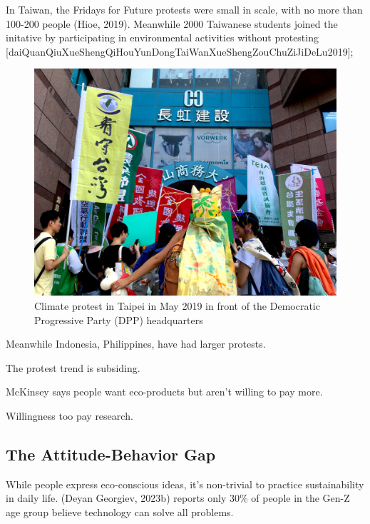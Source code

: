 \documentclass[
  letterpaper,
  DIV=11,
  numbers=noendperiod]{scrartcl}
\begin{document}
In Taiwan, the Fridays for Future protests were small in scale, with no
more than 100-200 people (Hioe, 2019). Meanwhile 2000 Taiwanese students
joined the initative by participating in environmental activities
without protesting
{[}daiQuanQiuXueShengQiHouYunDongTaiWanXueShengZouChuZiJiDeLu2019{]};

\begin{figure}[H]

{\centering \includegraphics[width=1\linewidth,height=\textheight,keepaspectratio]{./images/college/taipei.jpg}

}

\caption{Climate protest in Taipei in May 2019 in front of the
Democratic Progressive Party (DPP) headquarters}

\end{figure}%

Meanwhile Indonesia, Philippines, have had larger protests.

The protest trend is subsiding.

McKinsey says people want eco-products but aren't willing to pay more.

Willingness too pay research.

\subsection{The Attitude-Behavior Gap}\label{the-attitude-behavior-gap}

While people express eco-conscious ideas, it's non-trivial to practice
sustainability in daily life. (Deyan Georgiev, 2023b) reports only 30\%
of people in the Gen-Z age group believe technology can solve all
problems.
\end{document}
